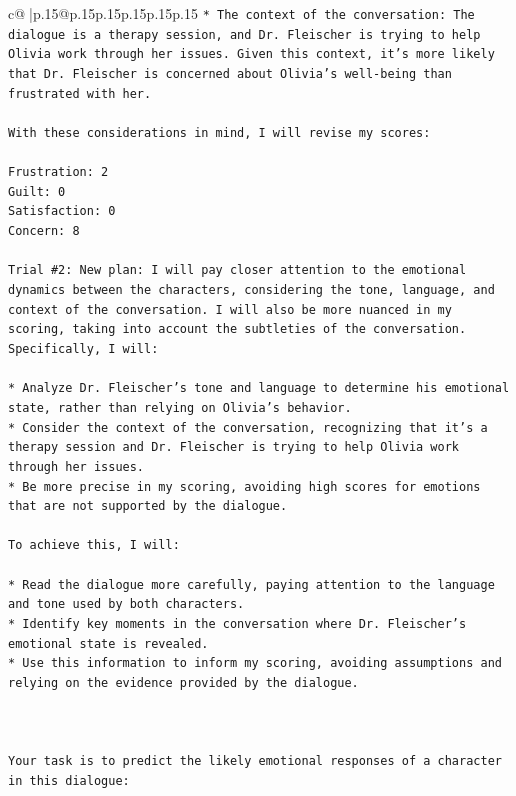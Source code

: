 \documentclass{article}
\begin{document}
{\begin{supertabular}{c@{$\;$}|p{.15\linewidth}@{}p{.15\linewidth}p{.15\linewidth}p{.15\linewidth}p{.15\linewidth}p{.15\linewidth}}
{{{\texttt{* The context of the conversation: The dialogue is a therapy session, and Dr. Fleischer is trying to help Olivia work through her issues. Given this context, it's more likely that Dr. Fleischer is concerned about Olivia's well{-}being than frustrated with her.} \\
\\ 
\texttt{With these considerations in mind, I will revise my scores:} \\
\\ 
\texttt{Frustration: 2} \\
\texttt{Guilt: 0} \\
\texttt{Satisfaction: 0} \\
\texttt{Concern: 8} \\
\\ 
\texttt{Trial \#2: New plan: I will pay closer attention to the emotional dynamics between the characters, considering the tone, language, and context of the conversation. I will also be more nuanced in my scoring, taking into account the subtleties of the conversation. Specifically, I will:} \\
\\ 
\texttt{* Analyze Dr. Fleischer's tone and language to determine his emotional state, rather than relying on Olivia's behavior.} \\
\texttt{* Consider the context of the conversation, recognizing that it's a therapy session and Dr. Fleischer is trying to help Olivia work through her issues.} \\
\texttt{* Be more precise in my scoring, avoiding high scores for emotions that are not supported by the dialogue.} \\
\\ 
\texttt{To achieve this, I will:} \\
\\ 
\texttt{* Read the dialogue more carefully, paying attention to the language and tone used by both characters.} \\
\texttt{* Identify key moments in the conversation where Dr. Fleischer's emotional state is revealed.} \\
\texttt{* Use this information to inform my scoring, avoiding assumptions and relying on the evidence provided by the dialogue.} \\
\\ 
\\ 
\\ 
\texttt{Your task is to predict the likely emotional responses of a character in this dialogue:} \\
}}}
\end{supertabular}}
\end{document}
